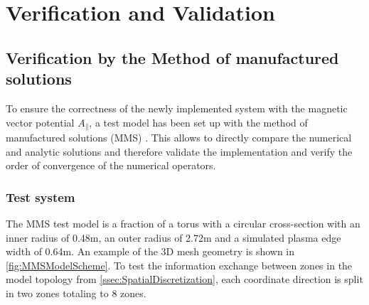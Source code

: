 \chapter{Verification and Validation}
\section{Verification by the Method of manufactured solutions}
To ensure the correctness of the newly implemented system with the magnetic vector potential $A_\parallel$, a test model has been set up with the method of manufactured solutions (MMS) \cite{ManufacturedSolution}. This allows to directly compare the numerical and analytic solutions and therefore validate the implementation and verify the order of convergence of the numerical operators. 

\subsection{Test system}
The MMS test model is a fraction of a torus with a circular cross-section with an inner radius of 0.48m, an outer radius of 2.72m and a simulated plasma edge width of 0.64m. An example of the 3D mesh geometry is shown in \autoref{fig:MMSModelScheme}. To test the information exchange between zones in the model topology from \autoref{ssec:SpatialDiscretization}, each coordinate direction is split in two zones totaling to 8 zones.

